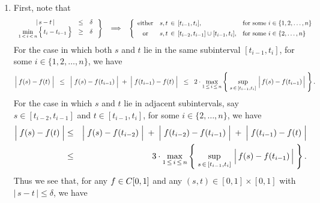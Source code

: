\begin{enumerate}
\item	First, note that
		\begin{equation*}
		\left.
		\begin{array}{ccc}
			\vert\,s - t\,\vert &\leq& \delta
			\\
			\underset{1\,<\,i\,<\,n}{\min}\left\{\,\overset{{\color{white}.}}{t}_{i} - t_{i-1}\,\right\} &\geq& \delta
		\end{array}
		\;\right\}
		\quad\Longrightarrow\quad
		\left\{\begin{array}{cll}
			\textnormal{either} & s,t\,\in\,[t_{i-1},t_{i}], & \textnormal{for some $i\in\{1,2,\ldots,n\}$}
			\\
			\textnormal{or} & s,t\,\overset{{\color{white}1}}{\in}\,[t_{i-2},t_{i-1}]\cup[t_{i-1},t_{i}], & \textnormal{for some $i\in\{2,\ldots,n\}$}
		\end{array}\right.
		\end{equation*}
		For the case in which both $s$ and $t$ lie in the same subinterval $[t_{i-1},t_{i}]$,
		for some $i\in\{1,2,\ldots,n\}$, we have
		\begin{equation*}
		\left\vert\;f(s)\overset{{\color{white}.}}{-}f(t)\;\right\vert
		\;\;\leq\;\;
			\left\vert\;f(s)\overset{{\color{white}.}}{-}f(t_{i-1})\;\right\vert
			\;+\;\left\vert\;f(t_{i-1})\overset{{\color{white}.}}{-}f(t)\;\right\vert
		\;\;\leq\;\;
			2\cdot\underset{1\,\leq\,i\,\leq\,n}{\max}\left\{\;
				\sup_{s\,\in\,[t_{i-1},t_{i}]}\,\left\vert\,\overset{{\color{white}.}}{f}(s) - f(t_{i-1})\,\right\vert
			\;\right\}.
		\end{equation*}
		For the case in which $s$ and $t$ lie in adjacent subintervals,
		say $s \in [t_{i-2},t_{i-1}]$ and $t \in [t_{i-1},t_{i}]$,
		for some $i\in\{2,\ldots,n\}$, we have
		\begin{eqnarray*}
		\left\vert\;f(s)\overset{{\color{white}.}}{-}f(t)\;\right\vert
		&\leq&
			\left\vert\;f(s)\overset{{\color{white}.}}{-}f(t_{i-2})\;\right\vert
			\;+\;\left\vert\;f(t_{i-2})\overset{{\color{white}.}}{-}f(t_{i-1})\;\right\vert
			\;+\;\left\vert\;f(t_{i-1})\overset{{\color{white}.}}{-}f(t)\;\right\vert
		\\
		&\leq&
			3\cdot\underset{1\,\leq\,i\,\leq\,n}{\max}\left\{\;
				\sup_{s\,\in\,[t_{i-1},t_{i}]}\,\left\vert\,\overset{{\color{white}.}}{f}(s) - f(t_{i-1})\,\right\vert
			\;\right\}.
		\end{eqnarray*}
		Thus we see that,
		for any $f \in C[0,1]$ and any $(s,t)\in[0,1]\times[0,1]$ with $\vert\,s-t\,\vert\leq\delta$, we have

\end{enumerate}
